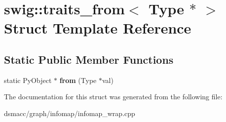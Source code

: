 \hypertarget{structswig_1_1traits__from_3_01Type_01_5_01_4}{}\section{swig\+:\+:traits\+\_\+from$<$ Type $\ast$ $>$ Struct Template Reference}
\label{structswig_1_1traits__from_3_01Type_01_5_01_4}
\subsection*{Static Public Member Functions}
\begin{DoxyCompactItemize}
\item 
\mbox{\label{structswig_1_1traits__from_3_01Type_01_5_01_4_a9df365d214884ed1c08f71211f5925ad}} 
static Py\+Object $\ast$ {\bfseries from} (Type $\ast$val)
\end{DoxyCompactItemize}


The documentation for this struct was generated from the following file\+:\begin{DoxyCompactItemize}
\item 
dsmacc/graph/infomap/infomap\+\_\+wrap.\+cpp\end{DoxyCompactItemize}
